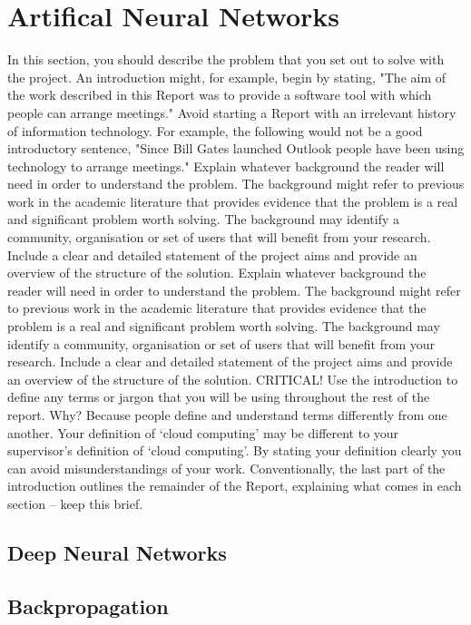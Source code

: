 \section{Artifical Neural Networks}
In this section, you should describe the problem that you set out to solve with the project. An introduction might, for example, begin by stating, "The aim of the work described in this Report was to provide a software tool with which people can arrange meetings." Avoid starting a Report with an irrelevant history of information technology. For example, the following would not be a good introductory sentence, "Since Bill Gates launched Outlook people have been using technology to arrange meetings."
Explain whatever background the reader will need in order to understand the problem. The background might refer to previous work in the academic literature that provides evidence that the problem is a real and significant problem worth solving. The background may identify a community, organisation or set of users that will benefit from your research. Include a clear and detailed statement of the project aims and provide an overview of the structure of the solution.
Explain whatever background the reader will need in order to understand the problem. The background might refer to previous work in the academic literature that provides evidence that the problem is a real and significant problem worth solving. The background may identify a community, organisation or set of users that will benefit from your research. Include a clear and detailed statement of the project aims and provide an overview of the structure of the solution.
CRITICAL! Use the introduction to define any terms or jargon that you will be using throughout the rest of the report.  Why?  Because people define and understand terms differently from one another.  Your definition of ‘cloud computing’ may be different to your supervisor’s definition of ‘cloud computing’.  By stating your definition clearly you can avoid misunderstandings of your work.
Conventionally, the last part of the introduction outlines the remainder of the Report, explaining what comes in each section – keep this brief.

\subsection{Deep Neural Networks}
\subsection{Backpropagation}
